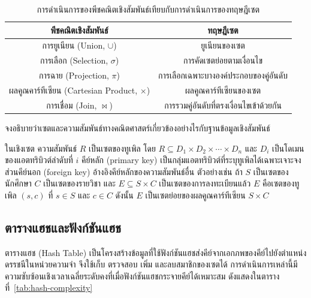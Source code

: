 \begin{table}[H]
\centering
\caption{การดำเนินการของพีชคณิตเชิงสัมพันธ์เทียบกับการดำเนินการของทฤษฎีเซต}
\label{tab:relalg-sets}
\renewcommand{\arraystretch}{1.3}
\begin{tabular}{|c|c|}
\hline
\textbf{พีชคณิตเชิงสัมพันธ์} & \textbf{ทฤษฎีเซต} \\
\hline
การยูเนียน (Union, $\cup$) & ยูเนียนของเซต \\
การเลือก (Selection, $\sigma$) & การคัดเซตย่อยตามเงื่อนไข \\
การฉาย (Projection, $\pi$) & การเลือกเฉพาะบางองค์ประกอบของคู่อันดับ \\
ผลคูณคาร์ทีเซียน (Cartesian Product, $\times$) & ผลคูณคาร์ทีเซียนของเซต \\
การเชื่อม (Join, $\bowtie$) & การรวมคู่อันดับที่ตรงเงื่อนไขเข้าด้วยกัน \\
\hline
\end{tabular}
\end{table}

\begin{ex}
\label{ex:db-relation}
จงอธิบายว่าเซตและความสัมพันธ์ทางคณิตศาสตร์เกี่ยวข้องอย่างไรกับฐานข้อมูลเชิงสัมพันธ์
\end{ex}
\begin{solution}
ในเชิงเซต ความสัมพันธ์ $R$ เป็นเซตของทูเพิล โดย $R \subseteq D_1 \times D_2 \times \cdots \times D_n$ และ $D_i$ เป็นโดเมนของแอตทริบิวต์ลำดับที่ $i$ คีย์หลัก (primary key) เป็นกลุ่มแอตทริบิวต์ที่ระบุทูเพิลได้เฉพาะเจาะจง ส่วนคีย์นอก (foreign key) อ้างอิงคีย์หลักของความสัมพันธ์อื่น ตัวอย่างเช่น ถ้า $S$ เป็นเซตของนักศึกษา $C$ เป็นเซตของรายวิชา และ $E \subseteq S \times C$ เป็นเซตของการลงทะเบียนแล้ว $E$ คือเซตของทูเพิล $(s,c)$ ที่ $s \in S$ และ $c \in C$ ดังนั้น $E$ เป็นเซตย่อยของผลคูณคาร์ทีเซียน $S \times C$ \solhere
\end{solution}

\subsection{ตารางแฮชและฟังก์ชันแฮช}
ตารางแฮช (Hash Table) เป็นโครงสร้างข้อมูลที่ใช้ฟังก์ชันแฮชส่งคีย์จากเอกภพของคีย์ไปยังตำแหน่งดรรชนีในหน่วยความจำ จึงใช้เก็บ ตรวจสอบ เพิ่ม และลบสมาชิกของเซตได้ การดำเนินการเหล่านี้มีความซับซ้อนเชิงเวลาเฉลี่ยระดับคงที่เมื่อฟังก์ชันแฮชกระจายคีย์ได้เหมาะสม ดังแสดงในตารางที่~\ref{tab:hash-complexity}~\parencite{gersting2014structures}


